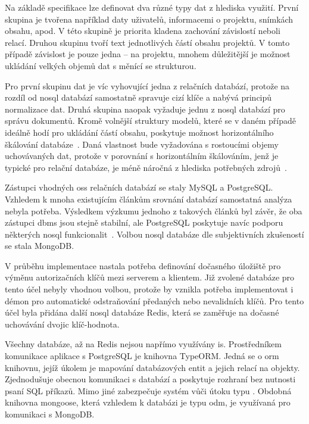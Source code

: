 Na základě specifikace lze definovat dva různé typy dat z hlediska využití. První skupina je tvořena například daty uživatelů, informacemi o projektu, snímkách obsahu, apod. V této skupině je priorita kladena zachování závislostí neboli relací. Druhou skupinu tvoří text jednotlivých částí obsahu projektů. V tomto případě závislost je pouze jedna -- na projektu, mnohem důležitější je možnost ukládání velkých objemů dat s měnící se strukturou.

Pro první skupinu dat je víc vyhovující jedna z relačních databází, protože na rozdíl od \gls{nosql} databází samostatně spravuje cizí klíče a nabývá principů normalizace dat. Druhá skupina naopak vyžaduje jednu z \gls{nosql} databází pro správu dokumentů. Kromě volnější struktury modelů, které se v daném případě ideálně hodí pro ukládání částí obsahu, poskytuje možnost horizontálního škálování databáze~\cite{dbScaling}. Daná vlastnost bude vyžadována s rostoucími objemy uchovávaných dat, protože v porovnání s horizontálním škálováním, jenž je typické pro relační databáze, je méně náročná z hlediska potřebných zdrojů~\cite{dbScaling}.


Zástupci vhodných \gls{oss} relačních databází se staly MySQL a PostgreSQL. Vzhledem k mnoha existujícím článkům srovnání databází samostatná analýza nebyla potřeba. Výsledkem výzkumu jednoho z takových článků byl závěr, že oba zástupci \gls{dbms} jsou stejně stabilní, ale PostgreSQL poskytuje navíc podporu některých \gls{nosql} funkcionalit~\cite{mysqlPostgres}. Volbou \gls{nosql} databáze dle subjektivních zkušeností se stala MongoDB.


V průběhu implementace nastala potřeba definování dočasného úložiště pro výměnu autorizačních klíčů mezi serverem a klientem. Již zvolené databáze pro tento účel nebyly vhodnou volbou, protože by vznikla potřeba implementovat i démon pro automatické odstraňování předaných nebo nevalidních klíčů. Pro tento účel byla přidána další \gls{nosql} databáze Redis, která se zaměřuje na dočasné uchovávání dvojic klíč-hodnota.


Všechny databáze, až na Redis nejsou napřímo využívány \gls{is}. Prostředníkem komunikace aplikace s PostgreSQL je knihovna TypeORM. Jedná se o \gls{orm} knihovnu, jejíž úkolem je mapování databázových entit a jejich relací na objekty. Zjednodušuje obecnou komunikaci s databází a poskytuje rozhraní bez nutnosti psaní SQL příkazů. Mimo jiné zabezpečuje systém vůči útoku typu . Obdobná knihovna mongoose, která vzhledem k databázi je typu \gls{odm}, je využívaná pro komunikaci s MongoDB.


